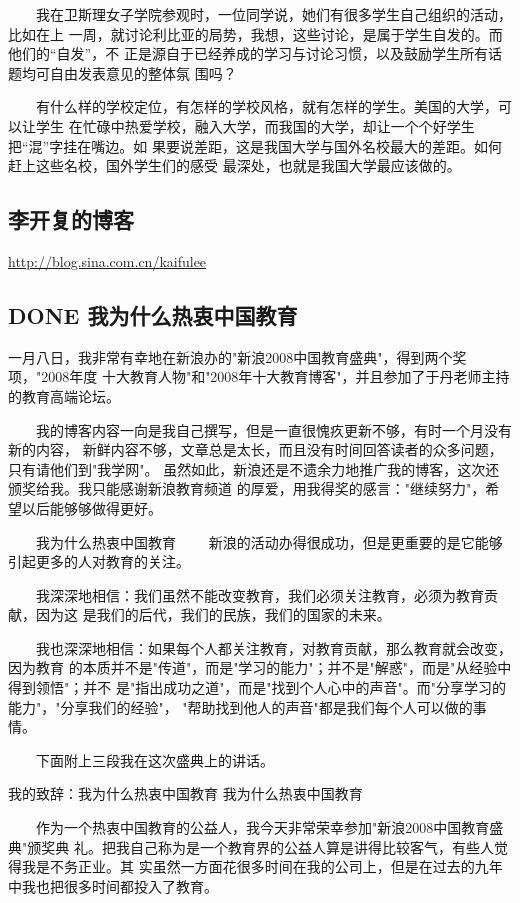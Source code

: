 \documentclass[11pt]{ctexart}
\begin{document}
{{{{　　我在卫斯理女子学院参观时，一位同学说，她们有很多学生自己组织的活动，比如在上
一周，就讨论利比亚的局势，我想，这些讨论，是属于学生自发的。而他们的“自发”，不
正是源自于已经养成的学习与讨论习惯，以及鼓励学生所有话题均可自由发表意见的整体氛
围吗？


　　有什么样的学校定位，有怎样的学校风格，就有怎样的学生。美国的大学，可以让学生
在忙碌中热爱学校，融入大学，而我国的大学，却让一个个好学生把“混”字挂在嘴边。如
果要说差距，这是我国大学与国外名校最大的差距。如何赶上这些名校，国外学生们的感受
最深处，也就是我国大学最应该做的。

\subsection{李开复的博客}
\label{sec:org9fead92}
\url{http://blog.sina.com.cn/kaifulee}
\subsection{{\bfseries\sffamily DONE} 我为什么热衷中国教育}
\label{sec:org87c9157}
一月八日，我非常有幸地在新浪办的"新浪2008中国教育盛典"，得到两个奖项，"2008年度
十大教育人物"和"2008年十大教育博客"，并且参加了于丹老师主持的教育高端论坛。


　　我的博客内容一向是我自己撰写，但是一直很愧疚更新不够，有时一个月没有新的内容，
新鲜内容不够，文章总是太长，而且没有时间回答读者的众多问题，只有请他们到"我学网"。
虽然如此，新浪还是不遗余力地推广我的博客，这次还颁奖给我。我只能感谢新浪教育频道
的厚爱，用我得奖的感言："继续努力"，希望以后能够够做得更好。

　　我为什么热衷中国教育
　　新浪的活动办得很成功，但是更重要的是它能够引起更多的人对教育的关注。

　　我深深地相信：我们虽然不能改变教育，我们必须关注教育，必须为教育贡献，因为这
是我们的后代，我们的民族，我们的国家的未来。


　　我也深深地相信：如果每个人都关注教育，对教育贡献，那么教育就会改变，因为教育
的本质并不是"传道"，而是"学习的能力"；并不是"解惑"，而是"从经验中得到领悟"；并不
是"指出成功之道"，而是"找到个人心中的声音"。而"分享学习的能力"，"分享我们的经验"，
"帮助找到他人的声音"都是我们每个人可以做的事情。


　　下面附上三段我在这次盛典上的讲话。

我的致辞：我为什么热衷中国教育
我为什么热衷中国教育

　　作为一个热衷中国教育的公益人，我今天非常荣幸参加"新浪2008中国教育盛典"颁奖典
礼。把我自己称为是一个教育界的公益人算是讲得比较客气，有些人觉得我是不务正业。其
实虽然一方面花很多时间在我的公司上，但是在过去的九年中我也把很多时间都投入了教育。


}}}}
\end{document}
